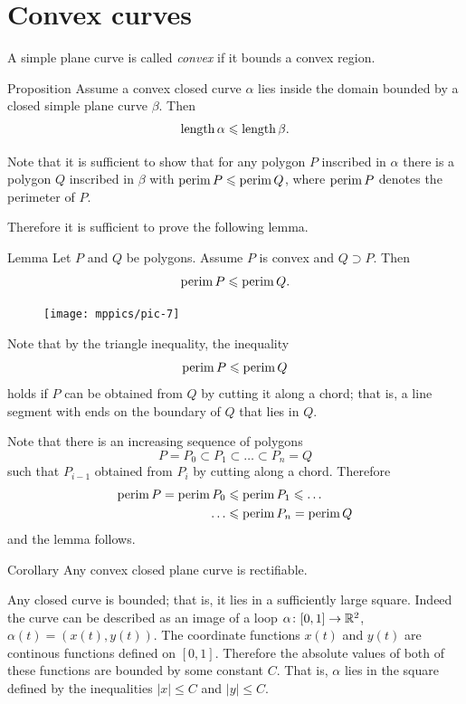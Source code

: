 \section*{Convex curves}

A simple plane curve is called \emph{convex} if it bounds a convex region.

\begin{thm}{Proposition}\label{prop:convex-curve}
Assume a convex closed curve $\alpha$ lies inside the domain bounded by a closed simple plane curve $\beta$.
Then
\[\mathop{\rm length}\nolimits\alpha\leqslant \mathop{\rm length}\nolimits\beta.\]
\end{thm}

Note that it is sufficient to show that for any polygon  $P$ inscribed in $\alpha$ there is a polygon $Q$ inscribed in $\beta$ with 
$\mathop{\rm perim}\nolimits P\leqslant \mathop{\rm perim}\nolimits Q$, where $\mathop{\rm perim}\nolimits P$ denotes the perimeter of $P$.

Therefore it is sufficient to prove the following lemma.


\begin{thm}{Lemma}\label{lem:perimeter}
Let $P$ and $Q$ be polygons.
Assume $P$ is convex and $Q\supset P$.
Then 
\[\mathop{\rm perim}\nolimits P\leqslant \mathop{\rm perim}\nolimits Q.\]

\end{thm}


\begin{figure}
\vskip-2mm
\centering
\texttt{[image: mppics/pic-7]}
\vskip2mm
\end{figure}

Note that by the triangle inequality,
the inequality
\[\mathop{\rm perim}\nolimits P\leqslant \mathop{\rm perim}\nolimits Q\]
holds
if $P$ can be obtained from $Q$ by cutting it along a chord;
that is, a line segment with ends on the boundary of $Q$ that lies in $Q$.


Note that there is an increasing sequence of polygons 
$$P=P_0\subset P_1\subset\dots\subset P_n=Q$$
such that $P_{i-1}$ obtained from $P_{i}$ by cutting along a chord.
Therefore 
\begin{align*}
\mathop{\rm perim}\nolimits P=\mathop{\rm perim}\nolimits P_0&\leqslant\mathop{\rm perim}\nolimits P_1\leqslant\dots
\\
\dots&\leqslant\mathop{\rm perim}\nolimits P_n=\mathop{\rm perim}\nolimits Q
\end{align*}
and the lemma follows.
\qeds

\begin{thm}{Corollary}
Any convex closed plane curve is rectifiable.  
\end{thm}

Any closed curve is bounded; that is, it lies in a sufficiently large square.
Indeed the curve can be described as an image of a loop $\alpha\colon[0,1]\to\mathbb{R}^2$, $\alpha(t)=(x(t),y(t))$.
The coordinate functions $x(t)$ and $y(t)$ are continous functions defined on $[0,1]$.
Therefore the absolute values of both of these functions are bounded by some constant $C$.
That is, $\alpha$ lies in the square defined by the inequalities $|x|\le C$ and $|y|\le C$.

